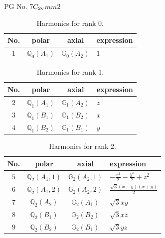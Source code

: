 \documentclass[fleqn,8pt,landscape]{jsarticle}
\begin{document}
\setcounter{MaxMatrixCols}{32}

\renewcommand{\tablename}{Table~}
\renewcommand{\figurename}{Figure~}
\begin{center}
\LARGE
PG No. 7\quad$C_{\rm 2v}$\quad$mm2$\quad[ orthorhombic ]
\end{center}
\begin{table}[ht!]
\begin{center}
\caption{Harmonics for rank 0.}
\renewcommand{\arraystretch}{1.3}
\begin{tabular}{cccl} \hline \hline
No. & polar & axial & expression \\ \hline
$ 1 $ & $ \mathbb{Q}_{0}(A_{1}) $ & $ \mathbb{G}_{0}(A_{2}) $ & $ 1 $ \\
 \hline \hline
\end{tabular}
\end{center}
\end{table}
\begin{table}[ht!]
\begin{center}
\caption{Harmonics for rank 1.}
\renewcommand{\arraystretch}{1.3}
\begin{tabular}{cccl} \hline \hline
No. & polar & axial & expression \\ \hline
$ 2 $ & $ \mathbb{Q}_{1}(A_{1}) $ & $ \mathbb{G}_{1}(A_{2}) $ & $ z $ \\
$ 3 $ & $ \mathbb{Q}_{1}(B_{1}) $ & $ \mathbb{G}_{1}(B_{2}) $ & $ x $ \\
$ 4 $ & $ \mathbb{Q}_{1}(B_{2}) $ & $ \mathbb{G}_{1}(B_{1}) $ & $ y $ \\
 \hline \hline
\end{tabular}
\end{center}
\end{table}
\begin{table}[ht!]
\begin{center}
\caption{Harmonics for rank 2.}
\renewcommand{\arraystretch}{1.3}
\begin{tabular}{cccl} \hline \hline
No. & polar & axial & expression \\ \hline
$ 5 $ & $ \mathbb{Q}_{2}(A_{1},1) $ & $ \mathbb{G}_{2}(A_{2},1) $ & $ - \frac{x^{2}}{2} - \frac{y^{2}}{2} + z^{2} $ \\
$ 6 $ & $ \mathbb{Q}_{2}(A_{1},2) $ & $ \mathbb{G}_{2}(A_{2},2) $ & $ \frac{\sqrt{3} \left(x - y\right) \left(x + y\right)}{2} $ \\
$ 7 $ & $ \mathbb{Q}_{2}(A_{2}) $ & $ \mathbb{G}_{2}(A_{1}) $ & $ \sqrt{3} x y $ \\
$ 8 $ & $ \mathbb{Q}_{2}(B_{1}) $ & $ \mathbb{G}_{2}(B_{2}) $ & $ \sqrt{3} x z $ \\
$ 9 $ & $ \mathbb{Q}_{2}(B_{2}) $ & $ \mathbb{G}_{2}(B_{1}) $ & $ \sqrt{3} y z $ \\
 \hline \hline
\end{tabular}
\end{center}
\end{table}
\end{document}
